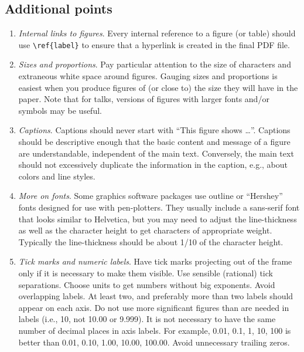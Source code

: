 \documentclass[letterpaper,11pt]{article}
\begin{document}
\subsection{Additional points}

\begin{enumerate}

\item {\it Internal links to figures\/}.  Every internal reference to a figure (or table) should use
\verb|\ref{label}| to ensure that a hyperlink is created in the final PDF file.

\item {\it Sizes and proportions\/}. Pay particular attention to the size of characters and
extraneous white space around figures.  Gauging sizes and proportions is easiest when you produce figures of (or close to) the size they will have in the paper.  Note that for talks, versions of figures with larger fonts and/or symbols may be useful.

\item {\it Captions\/}.  Captions should never start with ``This figure shows \dots''.  Captions should be descriptive enough that the basic content and message of a figure are understandable, independent of the main text.  Conversely, the main text should not excessively duplicate the information in the caption, e.g., about colors and line styles.

\item {\it More on fonts\/}.  Some graphics software packages use outline or
``Hershey'' fonts designed for use with pen-plotters.  They usually include a
sans-serif font that looks similar to Helvetica, but you may need to adjust
the line-thickness as well as the character height to get characters of
appropriate weight.  Typically the line-thickness should be about 1/10 of the
character height. %

\item {\it Tick marks and numeric labels\/}. Have tick marks projecting out of
the frame only if it is necessary to make them visible.  Use sensible
(rational) tick separations.  Choose units to get numbers without big
exponents.  Avoid overlapping labels.  At least two, and preferably more than
two labels should appear on each axis.  Do not use more significant figures
than are needed in labels (i.e., 10, not 10.00 or 9.999).  It is not necessary
to have the same number of decimal places in axis labels.  For example,
0.01, 0.1, 1, 10, 100 is better than 0.01, 0.10, 1.00, 10.00, 100.00.
Avoid unnecessary trailing zeros.


\end{enumerate}
\end{document}
